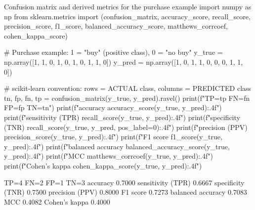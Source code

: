 \begin{pylisting}[label={lst:confusion}]{Confusion matrix and derived metrics for the purchase example}
import numpy as np
from sklearn.metrics import (confusion_matrix, accuracy_score, recall_score,
                             precision_score, f1_score, balanced_accuracy_score,
                             matthews_corrcoef, cohen_kappa_score)

# Purchase example: 1 = "buy" (positive class), 0 = "no buy"
y_true = np.array([1, 1, 0, 1, 0, 1, 0, 1, 1, 0])
y_pred = np.array([1, 0, 1, 1, 0, 0, 0, 1, 1, 0])

# scikit-learn convention: rows = ACTUAL class, columns = PREDICTED class
tn, fp, fn, tp = confusion_matrix(y_true, y_pred).ravel()
print(f"TP={tp} FN={fn} FP={fp} TN={tn}")
print(f"accuracy          {accuracy_score(y_true, y_pred):.4f}")
print(f"sensitivity (TPR) {recall_score(y_true, y_pred):.4f}")
print(f"specificity (TNR) {recall_score(y_true, y_pred, pos_label=0):.4f}")
print(f"precision (PPV)   {precision_score(y_true, y_pred):.4f}")
print(f"F1 score          {f1_score(y_true, y_pred):.4f}")
print(f"balanced accuracy {balanced_accuracy_score(y_true, y_pred):.4f}")
print(f"MCC               {matthews_corrcoef(y_true, y_pred):.4f}")
print(f"Cohen's kappa     {cohen_kappa_score(y_true, y_pred):.4f}")
\end{pylisting}
\begin{pyoutput}
TP=4 FN=2 FP=1 TN=3
accuracy          0.7000
sensitivity (TPR) 0.6667
specificity (TNR) 0.7500
precision (PPV)   0.8000
F1 score          0.7273
balanced accuracy 0.7083
MCC               0.4082
Cohen's kappa     0.4000
\end{pyoutput}

